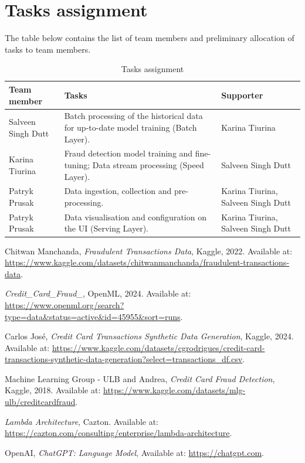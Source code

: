 \documentclass[12pt,a4paper, hidelinks]{article}
\begin{document}
\section{Tasks assignment}

The table below contains the list of team members and preliminary allocation of tasks to team members.

\begin{table}[htbp]
\centering
\begin{tabular}{|p{4cm}|p{6.5cm}|p{4cm}|}
\hline
\textbf{Team member} & \textbf{Tasks} & \textbf{Supporter} \\
\hline
Salveen Singh Dutt & Batch processing of the historical data for up-to-date model training (Batch Layer). & Karina Tiurina \\
\hline
Karina Tiurina & Fraud detection model training and fine-tuning; Data stream processing (Speed Layer). & Salveen Singh Dutt \\
\hline
Patryk Prusak & Data ingestion, collection and pre-processing. & Karina Tiurina, Salveen Singh Dutt  \\
\hline
Patryk Prusak & Data visualisation and configuration on the UI (Serving Layer). & Karina Tiurina, Salveen Singh Dutt \\
\hline
\end{tabular}
\caption{Tasks assignment}
\end{table}

\newpage

\begin{thebibliography}{9}

    Chitwan Manchanda,
    \textit{Fraudulent Transactions Data},
    Kaggle, 2022.
    Available at: \url{https://www.kaggle.com/datasets/chitwanmanchanda/fraudulent-transactions-data}.
    
    \textit{Credit\_Card\_Fraud\_},
    OpenML, 2024.
    Available at: \url{https://www.openml.org/search?type=data&status=active&id=45955&sort=runs}.

    Carlos José,
    \textit{Credit Card Transactions Synthetic Data Generation},
    Kaggle, 2024.
    Available at: \url{https://www.kaggle.com/datasets/cgrodrigues/credit-card-transactions-synthetic-data-generation?select=transactions_df.csv}.
    
    Machine Learning Group - ULB and Andrea,
    \textit{Credit Card Fraud Detection},
    Kaggle, 2018.
    Available at: \url{https://www.kaggle.com/datasets/mlg-ulb/creditcardfraud}.
    

    \textit{Lambda Architecture},
    Cazton.
    Available at: \url{https://cazton.com/consulting/enterprise/lambda-architecture}.

    OpenAI,
    \textit{ChatGPT: Language Model},
    Available at: \url{https://chatgpt.com}.
    
    \end{thebibliography}
\end{document}
